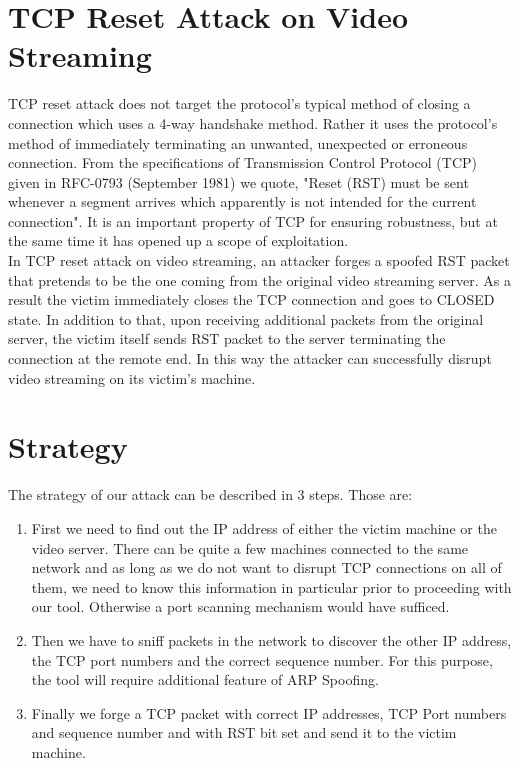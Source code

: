 \documentclass[14pt]{extarticle}
\begin{document}
\section{TCP Reset Attack on Video Streaming}
    TCP reset attack does not target the protocol's typical method of closing a connection which uses a 4-way handshake method. Rather it uses the protocol's method of immediately terminating an unwanted, unexpected or erroneous connection. From the specifications of Transmission Control Protocol (TCP) given in RFC-0793 (September 1981) we quote, "Reset (RST) must be sent whenever a segment arrives which apparently is not intended for the current connection". It is an important property of TCP for ensuring robustness, but at the same time it has opened up a scope of exploitation. \\ 
    In TCP reset attack on video streaming, an attacker forges a spoofed RST packet that pretends to be the one coming from the original video streaming server. As a result the victim immediately closes the TCP connection and goes to CLOSED state. In addition to that, upon receiving additional packets from the original server, the victim itself sends RST packet to the server terminating the connection at the remote end. In this way the attacker can successfully disrupt video streaming on its victim's machine.

\section{Strategy}
   
    The  strategy of our attack can be described in 3 steps. Those are:
    \begin{enumerate}
      \item First we need to find out the IP address of either the victim machine or the video server. There can be quite a few machines connected to the same network and as long as we do not want to disrupt TCP connections on all of them, we need to know this information in particular prior to proceeding with our tool. Otherwise a port scanning mechanism would have sufficed. 
      \item Then we have to sniff packets in the network to discover the other IP address, the TCP port numbers and the correct sequence number. For this purpose, the tool will require additional feature of ARP Spoofing.
      \item Finally we forge a TCP packet with correct IP addresses, TCP Port numbers and sequence number and with RST bit set and send it to the victim machine.
    \end{enumerate}
    
\end{document}

